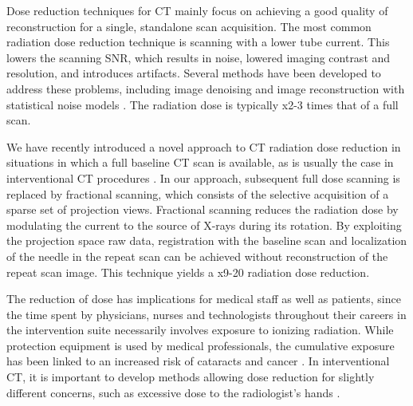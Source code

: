 Dose reduction techniques for CT mainly focus on achieving a good quality of reconstruction for a single, standalone scan acquisition. The most common radiation dose reduction technique is scanning with a lower tube current. This lowers the scanning SNR, which results in noise, lowered imaging contrast and resolution, and  introduces artifacts. Several methods have been developed to address these problems, including image denoising \cite{manduca2009projection} and image reconstruction with statistical noise models  \cite{zhang2016statistical,kim2015sparseview,niu2014sparse,liu2014total}. The radiation dose is typically x2-3 times that of a full scan. 

We have recently introduced a novel approach to CT radiation dose reduction in situations in which a full baseline CT scan is available, as is usually the case in interventional CT procedures \cite{medan2017sparse, medan2017reduced}. In our approach, subsequent full dose scanning is replaced by fractional scanning, which consists of the selective acquisition of a sparse set of projection views. Fractional scanning reduces the radiation dose by modulating the current to the source of X-rays during its rotation. By exploiting the projection space raw data, registration with the baseline scan and localization of the needle in the repeat scan can be achieved without reconstruction of the repeat scan image. This technique yields a x9-20 radiation dose reduction.

The reduction of dose has implications for medical staff as well as patients, since the time spent by physicians, nurses and technologists throughout their careers in the intervention suite necessarily involves exposure to ionizing radiation. While protection equipment is used by medical professionals, the cumulative exposure has been linked to an increased risk of cataracts and cancer \cite{miller2010occupational, sarti2012low}. In interventional CT, it is important to develop methods allowing dose reduction for slightly different concerns, such as excessive dose to the radiologist's hands \cite{stoeckelhuber2005radiation}.

